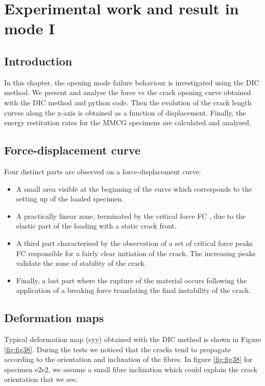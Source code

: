 \chapter{Experimental work and result in mode I}
\label{Chapter3}

\section{Introduction}

In this chapter, the opening mode failure behaviour is investigated using the DIC method. We present and analyse the force vs the crack opening curve obtained with the DIC method and python code.  Then the evolution of the crack length curves along the x-axis is obtained as a function of displacement. Finally, the energy restitution rates for the MMCG specimens are calculated and analysed.

\section{Force-displacement curve}

Four distinct parts are observed on a force-displacement curve:

\begin{itemize}
	\item A small area visible at the beginning of the curve which corresponds to the setting up of the loaded specimen. 
	\item A practically linear zone, terminated by the critical force FC , due to the elastic part of the loading with a static crack front.
	\item A third part characterised by the observation of a set of critical force peaks FC responsible for a fairly clear initiation of the crack. The increasing peaks validate the zone of stability of the crack.
	\item Finally, a last part where the rupture of the material occurs following the application of a breaking force translating the final instability of the crack.
\end{itemize}


\section{Deformation maps}

Typical deformation map ($\epsilon$yy) obtained with the DIC method is shown in Figure \ref{fig:fig38}.
During the tests we noticed that the cracks tend to propagate according to the orientation and inclination of the fibres.
In figure \ref{fig:fig38} for specimen e2e2, we assume a small fibre inclination which could explain the crack orientation that we see.

